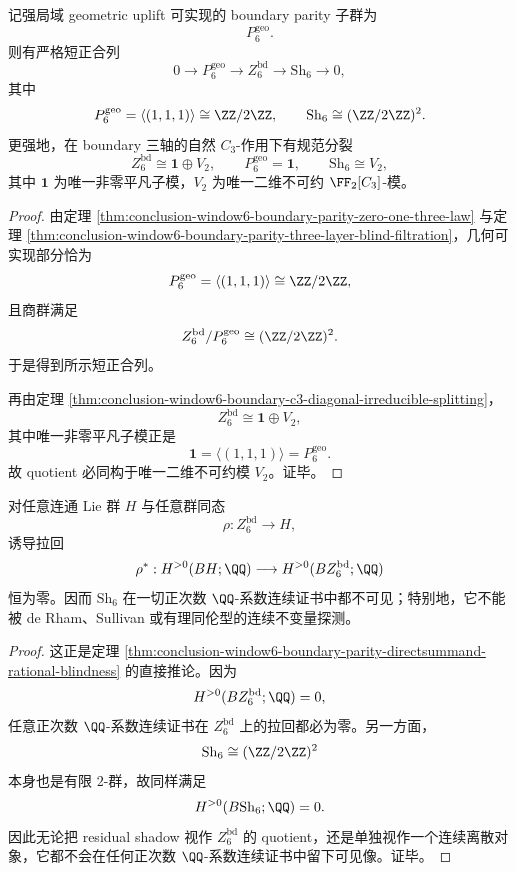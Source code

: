\begin{theorem}\label{thm:conclusion-window6-geometric-diagonal-bit-residual-shadow}
记强局域 geometric uplift 可实现的 boundary parity 子群为
\[
P_6^{\mathrm{geo}}.
\]
则有严格短正合列
\[
0\longrightarrow P_6^{\mathrm{geo}}
\longrightarrow Z_6^{\mathrm{bd}}
\longrightarrow \mathrm{Sh}_6
\longrightarrow 0,
\]
其中
\[
P_6^{\mathrm{geo}}=\langle(1,1,1)\rangle\cong \ZZ/2\ZZ,
\qquad
\mathrm{Sh}_6\cong (\ZZ/2\ZZ)^2.
\]
更强地，在 boundary 三轴的自然 \(C_3\)-作用下有规范分裂
\[
Z_6^{\mathrm{bd}}\cong \mathbf 1\oplus V_2,
\qquad
P_6^{\mathrm{geo}}=\mathbf 1,
\qquad
\mathrm{Sh}_6\cong V_2,
\]
其中 \(\mathbf 1\) 为唯一非零平凡子模，\(V_2\) 为唯一二维不可约 \(\FF_2[C_3]\)-模。
\end{theorem}
\begin{proof}
由定理 \ref{thm:conclusion-window6-boundary-parity-zero-one-three-law} 与定理 \ref{thm:conclusion-window6-boundary-parity-three-layer-blind-filtration}，几何可实现部分恰为
\[
P_6^{\mathrm{geo}}=\langle(1,1,1)\rangle\cong \ZZ/2\ZZ,
\]
且商群满足
\[
Z_6^{\mathrm{bd}}/P_6^{\mathrm{geo}}\cong (\ZZ/2\ZZ)^2.
\]
于是得到所示短正合列。

再由定理 \ref{thm:conclusion-window6-boundary-c3-diagonal-irreducible-splitting}，
\[
Z_6^{\mathrm{bd}}\cong \mathbf 1\oplus V_2,
\]
其中唯一非零平凡子模正是
\[
\mathbf 1=\langle(1,1,1)\rangle=P_6^{\mathrm{geo}}.
\]
故 quotient 必同构于唯一二维不可约模 \(V_2\)。证毕。
\end{proof}


\begin{corollary}\label{cor:conclusion-window6-residual-torsion-shadow-rational-blindness}
对任意连通 Lie 群 \(H\) 与任意群同态
\[
\rho:Z_6^{\mathrm{bd}}\longrightarrow H,
\]
诱导拉回
\[
\rho^*:H^{>0}(BH;\QQ)\longrightarrow H^{>0}(BZ_6^{\mathrm{bd}};\QQ)
\]
恒为零。因而 \(\mathrm{Sh}_6\) 在一切正次数 \(\QQ\)-系数连续证书中都不可见；特别地，它不能被 de Rham、Sullivan 或有理同伦型的连续不变量探测。
\end{corollary}
\begin{proof}
这正是定理 \ref{thm:conclusion-window6-boundary-parity-directsummand-rational-blindness} 的直接推论。因为
\[
H^{>0}(BZ_6^{\mathrm{bd}};\QQ)=0,
\]
任意正次数 \(\QQ\)-系数连续证书在 \(Z_6^{\mathrm{bd}}\) 上的拉回都必为零。另一方面，
\[
\mathrm{Sh}_6\cong (\ZZ/2\ZZ)^2
\]
本身也是有限 \(2\)-群，故同样满足
\[
H^{>0}(B\mathrm{Sh}_6;\QQ)=0.
\]
因此无论把 residual shadow 视作 \(Z_6^{\mathrm{bd}}\) 的 quotient，还是单独视作一个连续离散对象，它都不会在任何正次数 \(\QQ\)-系数连续证书中留下可见像。证毕。
\end{proof}

